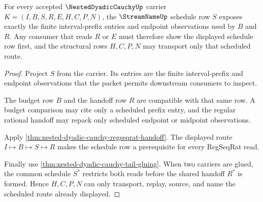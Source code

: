 \begin{theorem}
\label{thm:nested-dyadic-cauchy-obligation-schedule}
For every accepted $\NestedDyadicCauchyUp$ carrier $K=(I,B,S,R,E,H,C,P,N)$, the $\StreamNameUp$ schedule row $S$ exposes exactly the finite interval-prefix entries and endpoint observations used by $B$ and $R$. Any consumer that reads $R$ or $E$ must therefore show the displayed schedule row first, and the structural rows $H,C,P,N$ may transport only that scheduled route.
\end{theorem}
\begin{proof}
Project $S$ from the carrier. Its entries are the finite interval-prefix and endpoint observations that the packet permits downstream consumers to inspect.

The budget row $B$ and the handoff row $R$ are compatible with that same row. A budget comparison may cite only a scheduled prefix entry, and the regular rational handoff may repack only scheduled endpoint or midpoint observations.

Apply \autoref{thm:nested-dyadic-cauchy-regseqrat-handoff}. The displayed route $I\mapsto B\mapsto S\mapsto R$ makes the schedule row a prerequisite for every RegSeqRat read.

Finally use \autoref{thm:nested-dyadic-cauchy-tail-gluing}. When two carriers are glued, the common schedule $S^*$ restricts both reads before the shared handoff $R^*$ is formed. Hence $H,C,P,N$ can only transport, replay, source, and name the scheduled route already displayed.
\end{proof}


